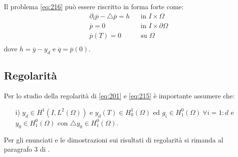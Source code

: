 Il problema \ref{eq:216} può essere riscritto in forma forte come:
\begin{equation}
\begin{aligned}
& {\partial_{t}}\overline{p} -\bigtriangleup\overline{p} = h & & \text{in }I{\times}\Omega \\
& \overline{p}=0 & & \text{in }I{\times}\partial\Omega \\
& \overline{p}(T)=0 & & \text{su }\Omega \\
\label{eq:217}
\end{aligned}
\end{equation}
dove $ h= \overline{y} - y_d$ e $\overline{q}=\overline{p}(0)$.

\subsection{Regolarità}
Per lo studio della regolarità di \ref{eq:201} e \ref{eq:215} è importante assumere che:
\begin{itemize}
\item[i)] $y_d \in H^1(I,{L^{2}(\Omega)})$ e $y_d(T) \in {H^{1}_{0}(\Omega)}$ ed $g_i \in {H^{0}_{1}(\Omega)} \ {\forall}i=1:d$ e $y_0 \in {H^{0}_{1}(\Omega)}$ con ${\bigtriangleup}y_0 \in {H^{0}_{1}(\Omega)}$.
\end{itemize} 
Per gli enunciati e le dimostrazioni sui risultati di regolarità si rimanda al paragrafo $3$ di \cite{MAIN}.